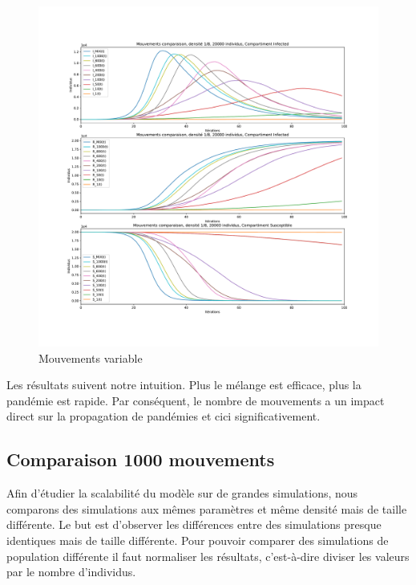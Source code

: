 \begin{figure}[h]
	\centering
	\captionsetup{justification=centering}
	\includegraphics[width=.7\textwidth]{Images/SIR_mouvements_variables.pdf}
	\caption{Mouvements variable}
\end{figure}

Les résultats suivent notre intuition. Plus le mélange est efficace, plus la pandémie est rapide. Par conséquent, le nombre de mouvements a un impact direct sur la propagation de pandémies et cici significativement. 

\newpage

\subsection{Comparaison 1000 mouvements}

Afin d'étudier la scalabilité du modèle sur de grandes simulations, nous comparons des simulations aux mêmes paramètres et même densité mais de taille différente. Le but est d'observer les différences entre des simulations presque identiques mais de taille différente. Pour pouvoir comparer des simulations de population différente il faut normaliser les résultats, c'est-à-dire diviser les valeurs par le nombre d'individus.

